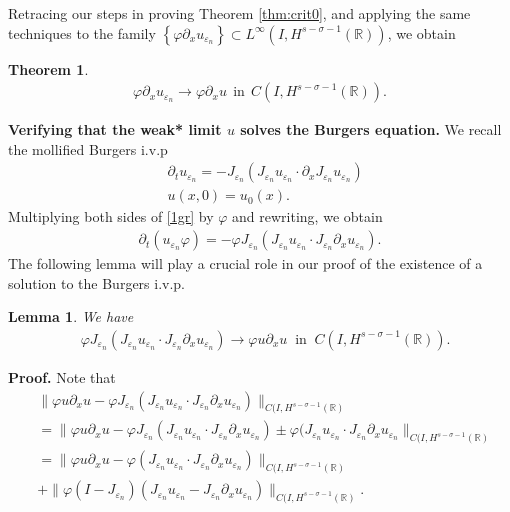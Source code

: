 \documentclass[12pt,reqno]{amsart}
\newcommand{\rr}{\mathbb{R}}
\newcommand{\p}{\partial}
\newcommand{\ee}{\varepsilon}
\newcommand{\vp}{\varphi}
\theoremstyle{plain}  %
\newtheorem{theorem}{Theorem}
\newtheorem{lemma}{Lemma}
\theoremstyle{definition}
\begin{document}
	Retracing our steps in proving Theorem \ref{thm:crit0}, and applying
	the same techniques to the family $\left\{ \vp \p_x u_{\ee_n} \right\}
	\subset L^\infty(I, H^{s-\sigma - 1}(\rr))$, we obtain
	\begin{theorem}
		\label{thm:crit1}
			\begin{equation}
			\begin{split}
				\vp \p_x u_{\ee_n} \to \vp \p_x u \ \ \text{in}  \ \ C(I,
				H^{s-\sigma - 1}(\rr)).
				\label{dx_vp_u_ep_conv}
			\end{split}
		\end{equation}
	\end{theorem}


		\vskip0.1in
		{\bf Verifying that the weak* limit $u$ solves the Burgers equation.} 
		We recall the mollified Burgers i.v.p
		\begin{align}
			& \p_t u_{\ee_n}  = -J_{\ee_n} (J_{\ee_n} u_{\ee_n} \cdot \p_x
			J_{\ee_n} u_{\ee_n})
			\label{1gr}
			\\
			& u(x,0) = u_0(x).
			\label{2gr}
		\end{align}
		Multiplying both sides of \eqref{1gr} by $\varphi$ and rewriting,
		we obtain
		\begin{equation}
			\label{3}
			\begin{split}
				\p_t(u_{\ee_n} \varphi) = -\vp J_{\ee_n}(J_{\ee_n} u_{\ee_n} \cdot
				J_{\ee_n} \p_x u_{\ee_n}).
			\end{split}
		\end{equation}
		The following lemma will play a crucial role in our proof of the
		existence of a solution to the Burgers i.v.p.
		\begin{lemma}
			\label{lem:cc}
			We have
			\begin{equation}
				\begin{split}
					\label{burgers_and_nonlocal_conv}
				& \vp J_{\varepsilon_n} (J_{\varepsilon_n} u_{\varepsilon_n} 
				\cdot J_{\varepsilon_n}\partial_x u_{\varepsilon_n}) 
				\to \vp u \partial_x u \; \; 
				\text{in} \; \;
				C(I, H^{s-\sigma-1}(\rr)). 
			\end{split}
			\end{equation}
		\end{lemma}
		{\bf Proof.} Note that
		\begin{equation}
			\begin{split}
				& \|\vp u \p_x u - \vp J_{\ee_n} (J_{\ee_n} u_{\ee_n} \cdot
				J_{\ee_n} \p_x u_{\ee_n} ) \|_{C(I, H^{s-\sigma -1}(\rr)}
				\\
				& = \|\vp u \p_x u - \vp J_{\ee_n} (J_{\ee_n} u_{\ee_n} \cdot
				J_{\ee_n} \p_x u_{\ee_n} ) \pm \vp ( J_{\ee_n} u_{\ee_n}
				\cdot J_{\ee_n} \p_x u_{\ee_n}\|_{C(I, H^{s-\sigma -1}(\rr)}
				\\
				& = \|\vp u \p_x u - \vp (J_{\ee_n} u_{\ee_n} \cdot
				J_{\ee_n} \p_x u_{\ee_n} ) \|_{C(I, H^{s-\sigma -1}(\rr)}
				\\
				& + \|\vp (I-J_{\ee_n}) (J_{\ee_n} u_{\ee_n} - J_{\ee_n}
				\p_x u_{\ee_n}) \|_{C(I, H^{s-\sigma -1}(\rr)}.
				\label{0cc}
			\end{split}
		\end{equation}
\end{document}

